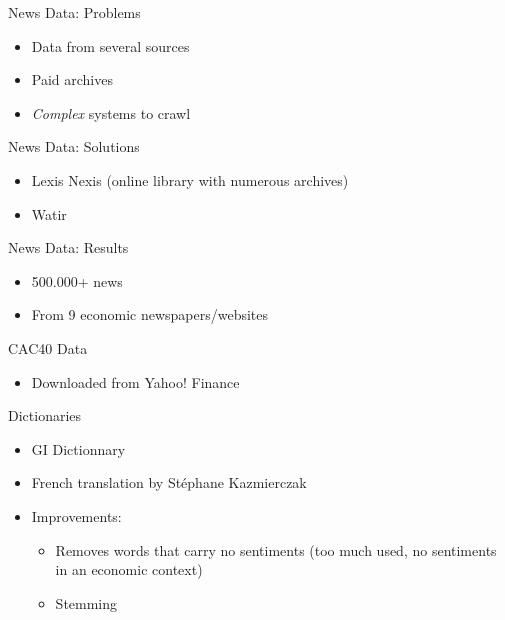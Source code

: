 \documentclass{beamer}
\begin{document}
	\begin{frame}{News Data: Problems}
		\begin{itemize}
			\item Data from several sources
			\item Paid archives
			\item \emph{Complex} systems to crawl
		\end{itemize}
	\end{frame}

	\begin{frame}{News Data: Solutions}
		\begin{itemize}
			\item Lexis Nexis (online library with numerous archives)
			\item Watir
		\end{itemize}
	\end{frame}

	\begin{frame}{News Data: Results}
		\begin{itemize}
			\item 500.000+ news
			\item From 9 economic newspapers/websites
		\end{itemize}
	\end{frame}

	\begin{frame}{CAC40 Data}
		\begin{itemize}
			\item Downloaded from Yahoo! Finance
		\end{itemize}
	\end{frame}

	\begin{frame}{Dictionaries}
		\begin{itemize}
			\item GI Dictionnary
			\item French translation by Stéphane Kazmierczak
			\pause \item Improvements:
				\begin{itemize}
					\item Removes words that carry no sentiments (too much used, no sentiments in an economic context)
					\item Stemming
				\end{itemize}
		\end{itemize}
	\end{frame}
\end{document}
